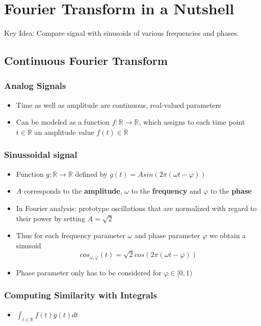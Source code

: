 \documentclass{scrartcl}
\begin{document}
\section{Fourier Transform in a Nutshell}
Key Idea: Compare signal with sinusoids of various frequencies and phases. 

\subsection{Continuous Fourier Transform}
\subsubsection*{Analog Signals}
\begin{itemize}
    \item
        Time as well as amplitude are continuous, real-valued parameters
    \item
        Can be modeled as a function $f: \mathbb{R} \rightarrow \mathbb{R}$, which assigns to each time point $t \in \mathbb{R}$ an amplitude value $f(t) \in \mathbb{R}$
\end{itemize}
\subsubsection*{Sinussoidal signal}
\begin{itemize}
    \item
        Function $g: \mathbb{R} \rightarrow \mathbb{R}$ defined by $g(t) = A sin(2\pi(\omega t - \varphi))$
    \item
        $A$ corresponds to the \textbf{amplitude}, $\omega$ to the \textbf{frequency} and $\varphi$ to the \textbf{phase}
    \item
        In Fourier analysis: prototype oscillations that are normalized with regard to their power by setting $A = \sqrt2$
    \item
        Thus for each frequency parameter $\omega$ and phase parameter $\varphi$ we obtain a sinusoid 
        $$cos_{\omega, \varphi}(t) = \sqrt2 cos(2\pi(\omega t - \varphi))$$
    \item
        Phase parameter only has to be considered for $\varphi \in [0, 1)$
\end{itemize}
\subsubsection*{Computing Similarity with Integrals}
\begin{itemize}
    \item
        $\int_{t \in \mathbb{R}} f(t)g(t) dt$
\end{itemize}
\end{document}
